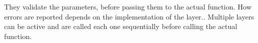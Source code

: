 They validate the parameters, before passing them to the actual function. How errors are reported depends on the implementation of the layer.. Multiple layers can be active and are called each one sequentially before calling the actual function. \cite{khronos:vulkan:spec1.1}












